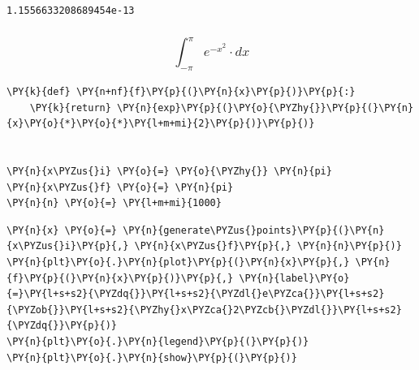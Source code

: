             \begin{tcolorbox}[breakable, size=fbox, boxrule=.5pt, pad at break*=1mm, opacityfill=0]
\begin{Verbatim}[commandchars=\\\{\}]
1.1556633208689454e-13
\end{Verbatim}
\end{tcolorbox}
        
    \hypertarget{int_-pipi-e-x2-cdot-dx}{%
\subsubsection{\texorpdfstring{\[\int_{-\pi}^{\pi} e^{-x^2} \cdot dx\]}{\textbackslash int\_\{-\textbackslash pi\}\^{}\{\textbackslash pi\} e\^{}\{-x\^{}2\} \textbackslash cdot dx}}\label{int_-pipi-e-x2-cdot-dx}}

    \begin{tcolorbox}[breakable, size=fbox, boxrule=1pt, pad at break*=1mm,colback=cellbackground, colframe=cellborder]
\begin{Verbatim}[commandchars=\\\{\}]
\PY{k}{def} \PY{n+nf}{f}\PY{p}{(}\PY{n}{x}\PY{p}{)}\PY{p}{:}
    \PY{k}{return} \PY{n}{exp}\PY{p}{(}\PY{o}{\PYZhy{}}\PY{p}{(}\PY{n}{x}\PY{o}{*}\PY{o}{*}\PY{l+m+mi}{2}\PY{p}{)}\PY{p}{)}


\PY{n}{x\PYZus{}i} \PY{o}{=} \PY{o}{\PYZhy{}} \PY{n}{pi}
\PY{n}{x\PYZus{}f} \PY{o}{=} \PY{n}{pi}
\PY{n}{n} \PY{o}{=} \PY{l+m+mi}{1000}
\end{Verbatim}
\end{tcolorbox}

    \begin{tcolorbox}[breakable, size=fbox, boxrule=1pt, pad at break*=1mm,colback=cellbackground, colframe=cellborder]
\begin{Verbatim}[commandchars=\\\{\}]
\PY{n}{x} \PY{o}{=} \PY{n}{generate\PYZus{}points}\PY{p}{(}\PY{n}{x\PYZus{}i}\PY{p}{,} \PY{n}{x\PYZus{}f}\PY{p}{,} \PY{n}{n}\PY{p}{)}
\PY{n}{plt}\PY{o}{.}\PY{n}{plot}\PY{p}{(}\PY{n}{x}\PY{p}{,} \PY{n}{f}\PY{p}{(}\PY{n}{x}\PY{p}{)}\PY{p}{,} \PY{n}{label}\PY{o}{=}\PY{l+s+s2}{\PYZdq{}}\PY{l+s+s2}{\PYZdl{}e\PYZca{}}\PY{l+s+s2}{\PYZob{}}\PY{l+s+s2}{\PYZhy{}x\PYZca{}2\PYZcb{}\PYZdl{}}\PY{l+s+s2}{\PYZdq{}}\PY{p}{)}
\PY{n}{plt}\PY{o}{.}\PY{n}{legend}\PY{p}{(}\PY{p}{)}
\PY{n}{plt}\PY{o}{.}\PY{n}{show}\PY{p}{(}\PY{p}{)}
\end{Verbatim}
\end{tcolorbox}

